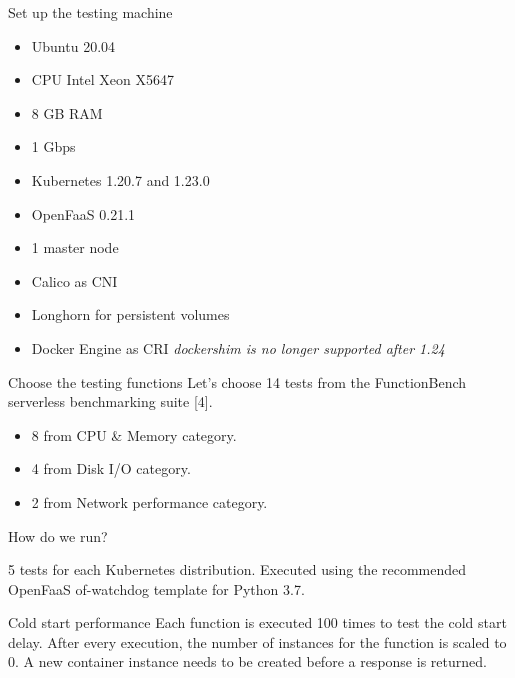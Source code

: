 \begin{frame}{Set up the testing machine}
\begin{itemize}
    \item Ubuntu 20.04
    \item CPU Intel Xeon X5647
    \item 8 GB RAM
    \item 1 Gbps
    \item Kubernetes 1.20.7 and 1.23.0
    \item OpenFaaS 0.21.1
    \item 1 master node
    \item Calico as CNI
    \item Longhorn for persistent volumes
    \item Docker Engine as CRI \pause \textit{\alert{dockershim is no longer supported after 1.24}}
    
\end{itemize}
    
\end{frame}

\begin{frame}{Choose the testing functions}
Let's choose 14 tests from the FunctionBench serverless benchmarking suite [4].

\begin{itemize}
    \item 8 from CPU \& Memory category.
    \item 4 from Disk I/O category.
    \item 2 from Network performance category.
\end{itemize}
    
\end{frame}

\begin{frame}{How do we run?}

5 tests for each Kubernetes distribution. Executed using the recommended OpenFaaS of-watchdog template for Python 3.7.

\end{frame}

\begin{frame}{Cold start performance}
Each function is executed 100 times to test the cold start delay. \pause
After every execution, the number of instances for the function is scaled to 0. A new container instance needs to be created before a response is returned.
\end{frame}

